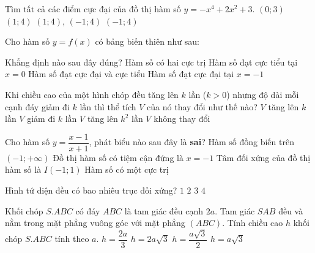 \begin{ex}%
Tìm tất cả các điểm cực đại của đồ thị hàm số $y=-x^4+2x^2+3$.
\choice
{$(0;3)$}
{$(1;4)$}
{\True $(1;4)$, $(-1;4)$}
{$(-1;4)$}
\end{ex}
\begin{ex}%
Cho hàm số $y=f(x)$ có bảng biến thiên như sau:
\begin{center}
\end{center}
Khẳng định nào sau đây đúng?
\choice
{Hàm số có hai cực trị}
{\True Hàm số đạt cực tiểu tại $x=0$}
{Hàm số đạt cực đại và cực tiểu}
{Hàm số đạt cực đại tại $x=-1$}
\end{ex}
\begin{ex}%
Khi chiều cao của một hình chóp đều tăng lên $k$ lần ($k>0$) nhưng độ dài mỗi cạnh đáy giảm đi $k$ lần thì thể tích $V$ của nó thay đổi như thế nào?
\choice
{$V$ tăng lên $k$ lần}
{\True $V$ giảm đi $k$ lần}
{$V$ tăng lên $k^2$ lần}
{$V$ không thay đổi}
\end{ex}
\begin{ex}%
Cho hàm số $y=\dfrac{x-1}{x+1}$, phát biểu nào sau đây là \textbf{sai}?
\choice
{Hàm số đồng biến trên $(-1;+\infty)$}
{Đồ thị hàm số có tiệm cận đứng là $x=-1$}
{Tâm đối xứng của đồ thị hàm số là $I(-1;1)$}
{\True Hàm số có một cực trị}
\end{ex}
\begin{ex}%
Hình tứ diện đều có bao nhiêu trục đối xứng?
\choice
{$1$}
{$2$}
{$3$}
{\True $4$}
\end{ex}
\begin{ex}%
Khối chóp $S.ABC$ có đáy $ABC$ là tam giác đều cạnh $2a$. Tam giác $SAB$ đều và nằm trong mặt phẳng vuông góc với mặt phẳng $(ABC)$. Tính chiều cao $h$ khối chóp $S.ABC$ tính theo $a$.
\choice
{$h=\dfrac{2a}{3}$}
{$h=2a\sqrt{3}$}
{$h=\dfrac{a\sqrt{3}}{2}$}
{\True $h=a\sqrt{3}$}
\end{ex}

